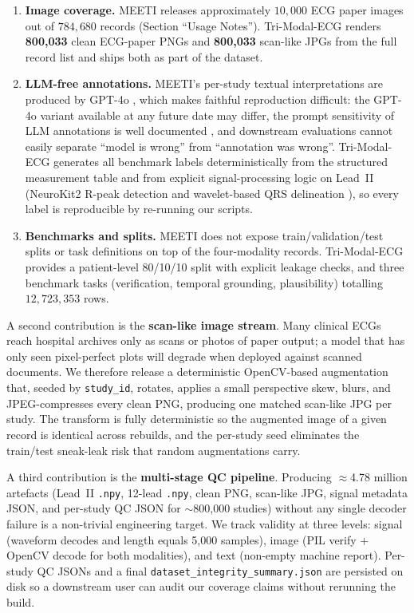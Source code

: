\documentclass[12pt,letterpaper]{article}
\begin{document}
\begin{enumerate}
    \item \textbf{Image coverage.} MEETI \cite{zhang2024meeti} releases approximately $10{,}000$ ECG paper images out of $784{,}680$ records (Section ``Usage Notes''). Tri-Modal-ECG renders \textbf{800{,}033} clean ECG-paper PNGs and \textbf{800{,}033} scan-like JPGs from the full record list and ships both as part of the dataset.
    \item \textbf{LLM-free annotations.} MEETI's per-study textual interpretations are produced by GPT-4o \cite{achiam2023gpt}, which makes faithful reproduction difficult: the GPT-4o variant available at any future date may differ, the prompt sensitivity of LLM annotations is well documented \cite{sandmann2025benchmark}, and downstream evaluations cannot easily separate ``model is wrong'' from ``annotation was wrong''. Tri-Modal-ECG generates all benchmark labels deterministically from the structured measurement table and from explicit signal-processing logic on Lead~II (NeuroKit2 \cite{makowski2021neurokit2} R-peak detection \cite{pan1985realtime} and wavelet-based QRS delineation \cite{martinez2004wavelet}), so every label is reproducible by re-running our scripts.
    \item \textbf{Benchmarks and splits.} MEETI does not expose train/validation/test splits or task definitions on top of the four-modality records. Tri-Modal-ECG provides a patient-level 80/10/10 split with explicit leakage checks, and three benchmark tasks (verification, temporal grounding, plausibility) totalling $12{,}723{,}353$ rows.
\end{enumerate}

A second contribution is the \textbf{scan-like image stream}. Many clinical ECGs reach hospital archives only as scans or photos of paper output; a model that has only seen pixel-perfect plots will degrade when deployed against scanned documents. We therefore release a deterministic OpenCV-based augmentation that, seeded by \texttt{study\_id}, rotates, applies a small perspective skew, blurs, and JPEG-compresses every clean PNG, producing one matched scan-like JPG per study. The transform is fully deterministic so the augmented image of a given record is identical across rebuilds, and the per-study seed eliminates the train/test sneak-leak risk that random augmentations carry.

A third contribution is the \textbf{multi-stage QC pipeline}. Producing $\approx$4.78 million artefacts (Lead~II \texttt{.npy}, 12-lead \texttt{.npy}, clean PNG, scan-like JPG, signal metadata JSON, and per-study QC JSON for $\sim$800{,}000 studies) without any single decoder failure is a non-trivial engineering target. We track validity at three levels: signal (waveform decodes and length equals 5{,}000 samples), image (PIL verify $+$ OpenCV decode for both modalities), and text (non-empty machine report). Per-study QC JSONs and a final \texttt{dataset\_integrity\_summary.json} are persisted on disk so a downstream user can audit our coverage claims without rerunning the build.
\end{document}
